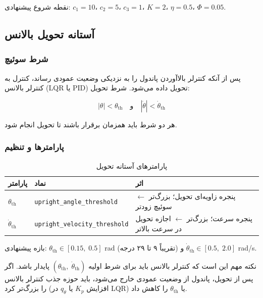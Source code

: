 نقطه شروع پیشنهادی: $c_1 = 10$، $c_2 = 5$، $c_3 = 1$، $K = 2$، $\eta = 0.5$، $\Phi = 0.05$.


\subsection{آستانه تحویل بالانس}

\subsubsection{شرط سوئیچ}

پس از آنکه کنترلر بالاآوردن پاندول را به نزدیکی وضعیت عمودی رساند، کنترل به کنترلر بالانس (LQR یا PID) تحویل داده می‌شود. شرط تحویل:

\begin{equation}
|\theta| < \theta_{\text{th}} \quad \text{و} \quad |\dot\theta| < \dot\theta_{\text{th}}
\label{eq:handoff}
\end{equation}

هر دو شرط باید همزمان برقرار باشند تا تحویل انجام شود.

\subsubsection{پارامترها و تنظیم}

\begin{table}[H]
\centering
\caption{پارامترهای آستانه تحویل}
\label{tab:handoff-params}
\begin{tabular}{@{}lll@{}}
\toprule
پارامتر & نماد & اثر \\
\midrule
$\theta_{\text{th}}$ & \texttt{upright\_angle\_threshold} & پنجره زاویه‌ای تحویل؛ بزرگ‌تر $\leftarrow$ سوئیچ زودتر \\
$\dot\theta_{\text{th}}$ & \texttt{upright\_velocity\_threshold} & پنجره سرعت؛ بزرگ‌تر $\leftarrow$ اجازه تحویل در سرعت بالاتر \\
\bottomrule
\end{tabular}
\end{table}

بازه پیشنهادی: $\theta_{\text{th}} \in [0.15,\; 0.5]$ rad (تقریباً ۹ تا ۲۹ درجه) و $\dot\theta_{\text{th}} \in [0.5,\; 2.0]$ rad/s.

نکته مهم این است که کنترلر بالانس باید برای شرط اولیه $(\theta_{\text{th}},\; \dot\theta_{\text{th}})$ پایدار باشد. اگر پس از تحویل، پاندول از وضعیت عمودی خارج می‌شود، باید حوزه جذب کنترلر بالانس را بزرگ‌تر کرد (افزایش $K_p$ یا $q_\theta$ در LQR) یا $\theta_{\text{th}}$ را کاهش داد.



